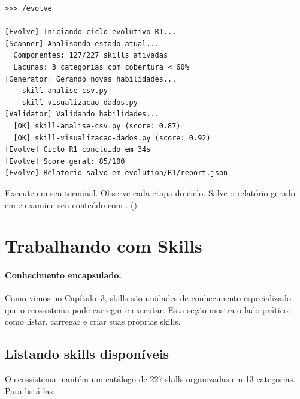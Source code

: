 \begin{lstlisting}[style=bashstyle, caption={Executando o primeiro ciclo
evolutivo}, label={lst:evolve}]
>>> /evolve

[Evolve] Iniciando ciclo evolutivo R1...
[Scanner] Analisando estado atual...
  Componentes: 127/227 skills ativadas
  Lacunas: 3 categorias com cobertura < 60%
[Generator] Gerando novas habilidades...
  - skill-analise-csv.py
  - skill-visualizacao-dados.py
[Validator] Validando habilidades...
  [OK] skill-analise-csv.py (score: 0.87)
  [OK] skill-visualizacao-dados.py (score: 0.92)
[Evolve] Ciclo R1 concluido em 34s
[Evolve] Score geral: 85/100
[Evolve] Relatorio salvo em evolution/R1/report.json
\end{lstlisting}

\begin{exercicio}
Execute  em seu terminal. Observe cada etapa do
ciclo. Salve o relatório gerado em
 e examine seu conteúdo com
. (\nivelzero)
\end{exercicio}

\section{Trabalhando com Skills}
\label{sec:skills}
\nivelbasico

\paragraph{Conhecimento encapsulado.} Como vimos no Capítulo~3, skills são
unidades de conhecimento especializado que o ecossistema pode carregar e
executar. Esta seção mostra o lado prático: como listar, carregar e criar
suas próprias skills.

\subsection{Listando skills disponíveis}
\label{subsec:listar-skills}

O ecossistema mantém um catálogo de 227 skills organizadas em 13
categorias. Para listá-las:

